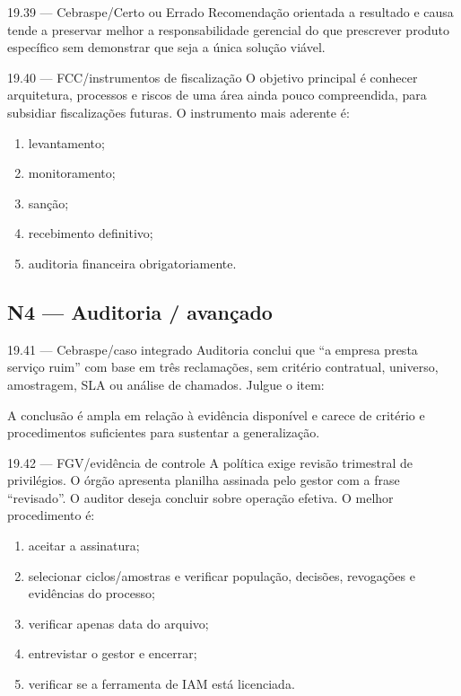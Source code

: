 \begin{questao}{ 19.39 — Cebraspe/Certo ou Errado}
Recomendação orientada a resultado e causa tende a preservar melhor a responsabilidade gerencial do que prescrever produto específico sem demonstrar que seja a única solução viável.
\end{questao}

\begin{questao}{ 19.40 — FCC/instrumentos de fiscalização}
O objetivo principal é conhecer arquitetura, processos e riscos de uma área ainda pouco compreendida, para subsidiar fiscalizações futuras. O instrumento mais aderente é:
\begin{enumerate}[label=\Alph*)]
\item levantamento;
\item monitoramento;
\item sanção;
\item recebimento definitivo;
\item auditoria financeira obrigatoriamente.
\end{enumerate}
\end{questao}

\subsection*{N4 — Auditoria / avançado}

\begin{questao}{ 19.41 — Cebraspe/caso integrado}
Auditoria conclui que ``a empresa presta serviço ruim'' com base em três reclamações, sem critério contratual, universo, amostragem, SLA ou análise de chamados. Julgue o item:

A conclusão é ampla em relação à evidência disponível e carece de critério e procedimentos suficientes para sustentar a generalização.
\end{questao}

\begin{questao}{ 19.42 — FGV/evidência de controle}
A política exige revisão trimestral de privilégios. O órgão apresenta planilha assinada pelo gestor com a frase ``revisado''. O auditor deseja concluir sobre operação efetiva. O melhor procedimento é:
\begin{enumerate}[label=\Alph*)]
\item aceitar a assinatura;
\item selecionar ciclos/amostras e verificar população, decisões, revogações e evidências do processo;
\item verificar apenas data do arquivo;
\item entrevistar o gestor e encerrar;
\item verificar se a ferramenta de IAM está licenciada.
\end{enumerate}
\end{questao}

